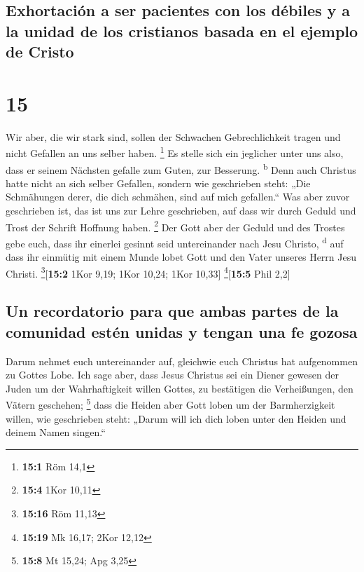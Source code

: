 \hypertarget{exhortaciuxf3n-a-ser-pacientes-con-los-duxe9biles-y-a-la-unidad-de-los-cristianos-basada-en-el-ejemplo-de-cristo}{%
\subsection{Exhortación a ser pacientes con los débiles y a la unidad de
los cristianos basada en el ejemplo de
Cristo}\label{exhortaciuxf3n-a-ser-pacientes-con-los-duxe9biles-y-a-la-unidad-de-los-cristianos-basada-en-el-ejemplo-de-cristo}}

\hypertarget{section-14}{%
\section{15}\label{section-14}}

 Wir aber, die wir stark sind, sollen der Schwachen
Gebrechlichkeit tragen und nicht Gefallen an uns selber haben.
\footnote{\textbf{15:1} Röm 14,1}  Es stelle sich ein
jeglicher unter uns also, dass er seinem Nächsten gefalle zum Guten, zur
Besserung. \textsuperscript{b}  Denn auch Christus hatte
nicht an sich selber Gefallen, sondern wie geschrieben steht: „Die
Schmähungen derer, die dich schmähen, sind auf mich gefallen.``
 Was aber zuvor geschrieben ist, das ist uns zur Lehre
geschrieben, auf dass wir durch Geduld und Trost der Schrift Hoffnung
haben. \footnote{\textbf{15:4} 1Kor 10,11}  Der Gott aber
der Geduld und des Trostes gebe euch, dass ihr einerlei gesinnt seid
untereinander nach Jesu Christo, \textsuperscript{d}  auf
dass ihr einmütig mit einem Munde lobet Gott und den Vater unseres Herrn
Jesu Christi. \footnote{\textbf{15:16} Röm 11,13}{[}\textbf{15:2} 1Kor
9,19; 1Kor 10,24; 1Kor 10,33{]} \footnote{\textbf{15:19} Mk 16,17; 2Kor
  12,12}{[}\textbf{15:5} Phil 2,2{]}

\hypertarget{un-recordatorio-para-que-ambas-partes-de-la-comunidad-estuxe9n-unidas-y-tengan-una-fe-gozosa}{%
\subsection{Un recordatorio para que ambas partes de la comunidad estén
unidas y tengan una fe
gozosa}\label{un-recordatorio-para-que-ambas-partes-de-la-comunidad-estuxe9n-unidas-y-tengan-una-fe-gozosa}}

 Darum nehmet euch untereinander auf, gleichwie euch
Christus hat aufgenommen zu Gottes Lobe.  Ich sage aber,
dass Jesus Christus sei ein Diener gewesen der Juden um der
Wahrhaftigkeit willen Gottes, zu bestätigen die Verheißungen, den Vätern
geschehen; \footnote{\textbf{15:8} Mt 15,24; Apg 3,25} 
dass die Heiden aber Gott loben um der Barmherzigkeit willen, wie
geschrieben steht: „Darum will ich dich loben unter den Heiden und
deinem Namen singen.``

